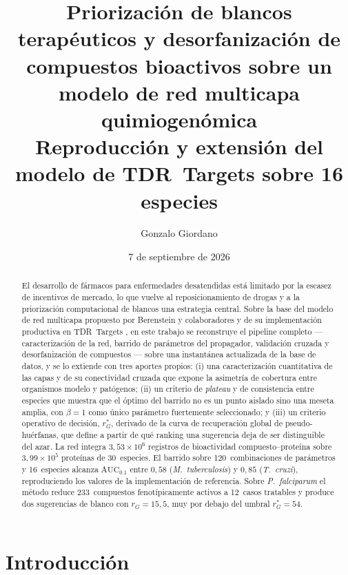 \documentclass[11pt,a4paper]{article}
\title{\bfseries Priorización de blancos terapéuticos y desorfanización de
compuestos bioactivos sobre un modelo de red multicapa quimiogenómica\\[2mm]
\large Reproducción y extensión del modelo de TDR~Targets sobre 16 especies}
\author{Gonzalo Giordano}
\date{7 de septiembre de 2026}
\newcommand{\AUCcero}{\text{AUC}_{0.1}}
\newcommand{\rG}{r_{G}}
\newcommand{\rGe}{r_{G}^{\ast}}
\newcommand{\spn}[1]{\textit{#1}}
\begin{document}
\maketitle

\begin{abstract}
\noindent
El desarrollo de fármacos para enfermedades desatendidas está limitado por la
escasez de incentivos de mercado, lo que vuelve al reposicionamiento de drogas y
a la priorización computacional de blancos una estrategia central. Sobre la base
del modelo de red multicapa propuesto por Berenstein y colaboradores
\citep{berenstein2016} y de su implementación productiva en TDR~Targets
\citep{tdrtargets6}, en este trabajo se reconstruye el pipeline completo ---
caracterización de la red, barrido de parámetros del propagador, validación
cruzada y desorfanización de compuestos --- sobre una instantánea actualizada de
la base de datos, y se lo extiende con tres aportes propios: (i) una
caracterización cuantitativa de las capas y de su conectividad cruzada que
expone la asimetría de cobertura entre organismos modelo y patógenos;
(ii) un criterio de \emph{plateau} y de consistencia entre especies que muestra
que el óptimo del barrido no es un punto aislado sino una meseta amplia, con
$\beta = 1$ como único parámetro fuertemente seleccionado; y (iii) un criterio
operativo de decisión, $\rGe$, derivado de la curva de recuperación global de
pseudo-huérfanas, que define a partir de qué ranking una sugerencia deja de ser
distinguible del azar. La red integra $3{,}53 \times 10^{6}$ registros de
bioactividad compuesto--proteína sobre $3{,}99 \times 10^{5}$ proteínas de
30~especies. El barrido sobre 120~combinaciones de parámetros y 16~especies
alcanza $\AUCcero$ entre $0{,}58$ (\spn{M.~tuberculosis}) y $0{,}85$
(\spn{T.~cruzi}), reproduciendo los valores de la implementación de referencia.
Sobre \spn{P.~falciparum} el método reduce 233~compuestos fenotípicamente activos
a 12~casos tratables y produce dos sugerencias de blanco con $\rG = 15{,}5$, muy
por debajo del umbral $\rGe = 54$.
\end{abstract}

\tableofcontents
\clearpage

\section{Introducción}
\end{document}
